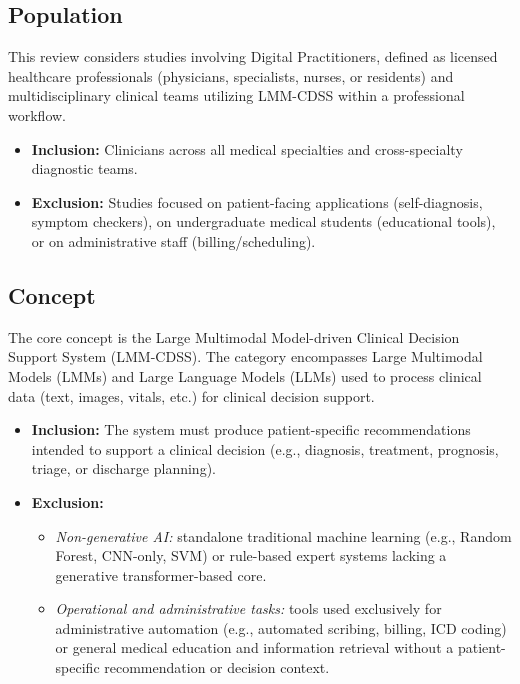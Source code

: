 \documentclass[review,12pt]{elsarticle}
\begin{document}
\subsection{Population} 

This review considers studies involving Digital Practitioners, defined as licensed healthcare professionals (physicians, specialists, nurses, or residents) and multidisciplinary clinical teams utilizing LMM-CDSS within a professional workflow.

\begin{itemize}
\item \textbf{Inclusion:} Clinicians across all medical specialties and cross-specialty diagnostic teams.
\item \textbf{Exclusion:}  Studies focused on patient-facing applications (self-diagnosis, symptom checkers), on undergraduate medical students (educational tools), or on administrative staff (billing/scheduling).
\end{itemize}

\subsection{Concept} The core concept is the Large Multimodal Model-driven Clinical Decision Support System (LMM-CDSS).  The category encompasses Large Multimodal Models (LMMs) and Large Language Models (LLMs) used to process clinical data (text, images, vitals, etc.) for clinical decision support.

\begin{itemize}
    \item \textbf{Inclusion:} The system must produce patient-specific recommendations intended to support a clinical decision (e.g., diagnosis, treatment, prognosis, triage, or discharge planning).

    \item \textbf{Exclusion:}
    \begin{itemize}
        \item  \textit{Non-generative AI:} standalone traditional machine learning (e.g., Random Forest, CNN-only, SVM) or rule-based expert systems lacking a generative transformer-based core.
        \item  \textit{Operational and administrative tasks:} tools used exclusively for administrative automation (e.g., automated scribing, billing, ICD coding) or general medical education and information retrieval without a patient-specific recommendation or decision context.
    \end{itemize}

\end{itemize}
\end{document}
